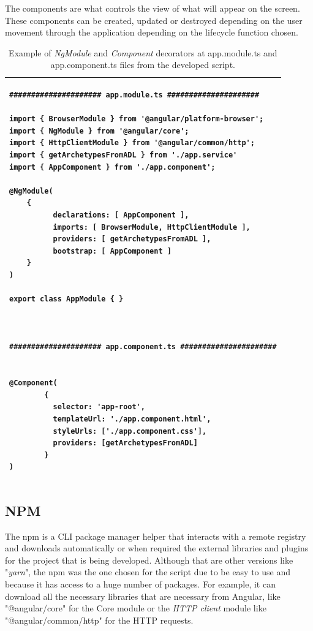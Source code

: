\documentclass[mim_thesis.tex]{subfiles}
\begin{document}
The components are what controls the view of what will appear on the screen. These components can be created, updated or destroyed depending on the user movement through the application depending on the lifecycle function chosen.   

\begin{table}[H]
\caption{Example of \textit{NgModule} and \textit{Component} decorators at app.module.ts and app.component.ts files from the developed script.}
\label{tab:ngmoduleexample}
\centering
\begin{tabular}{l}
\toprule[2pt]
\begin{lstlisting}[language=XML]
##################### app.module.ts #####################

import { BrowserModule } from '@angular/platform-browser';
import { NgModule } from '@angular/core';
import { HttpClientModule } from '@angular/common/http';
import { getArchetypesFromADL } from './app.service'
import { AppComponent } from './app.component';

@NgModule(
	{
          declarations: [ AppComponent ],
          imports: [ BrowserModule, HttpClientModule ],
          providers: [ getArchetypesFromADL ],
          bootstrap: [ AppComponent ]
	}
)

export class AppModule { }



##################### app.component.ts ######################


@Component(
    	{
          selector: 'app-root',
          templateUrl: './app.component.html',
          styleUrls: ['./app.component.css'],
          providers: [getArchetypesFromADL]
    	}
)

\end{lstlisting}
\tabularnewline \bottomrule[2pt]
\end{tabular}
\end{table}



\subsection{NPM}
The npm is a \ac{CLI} package manager helper that interacts with a remote registry and downloads automatically or when required the external libraries and plugins for the project that is being developed. Although that are other versions like "\textit{yarn}", the npm was the one chosen for the script due to be easy to use and because it has access to a huge number of packages. For example, it can download all the necessary libraries that are necessary from Angular, like "@angular/core" for the Core module or the \textit{HTTP client} module like "@angular/common/http" for the HTTP requests. 
\end{document}
